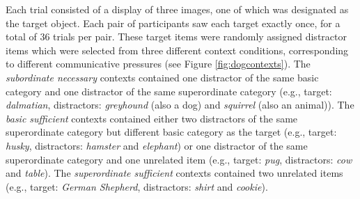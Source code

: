 \documentclass[11pt]{article}
\newcommand{\figref}[1]{Figure \ref{#1}}
\begin{document}
Each trial consisted of a display of three images, one of which was designated as the target object. Each pair of participants saw each target exactly once, for a total of 36 trials per pair. These target items were randomly assigned distractor items which were selected from three different context conditions, corresponding to different communicative pressures (see \figref{fig:dogcontexts}). The \emph{subordinate necessary} contexts contained one distractor of the same basic category and one distractor of the same superordinate category (e.g., target: \emph{dalmatian}, distractors: \emph{greyhound} (also a dog) and \emph{squirrel} (also an animal)). The \emph{basic sufficient} contexts contained either two distractors of the same superordinate category but different basic category as the target (e.g., target: \emph{husky}, distractors: \emph{hamster} and \emph{elephant}) or one distractor of the same superordinate category and one unrelated item (e.g., target: \emph{pug}, distractors: \emph{cow} and \emph{table}). The \emph{superordinate sufficient} contexts contained two unrelated items (e.g., target: \emph{German Shepherd}, distractors: \emph{shirt} and \emph{cookie}). 
\end{document}
